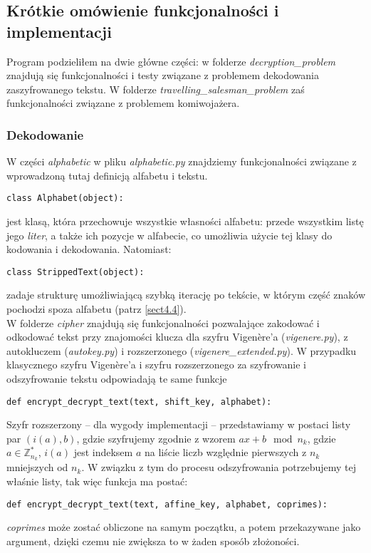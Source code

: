 \documentclass[a4paper]{article}
\theoremstyle{defn}
\theoremstyle{theorem}
\theoremstyle{lemma}
\theoremstyle{cor}
\theoremstyle{fact}
\begin{document}
\subsection{Krótkie omówienie funkcjonalności i implementacji}
Program podzieliłem na dwie główne części: w folderze \textit{decryption\_problem} znajdują się funkcjonalności i testy związane z problemem dekodowania zaszyfrowanego tekstu. W folderze \textit{travelling\_salesman\_problem} zaś funkcjonalności związane z problemem komiwojażera.
\subsubsection{Dekodowanie}
W części \textit{alphabetic} w pliku \textit{alphabetic.py} znajdziemy funkcjonalności związane z wprowadzoną tutaj definicją alfabetu i tekstu.
\begin{lstlisting}
class Alphabet(object):
\end{lstlisting}
jest klasą, która przechowuje wszystkie własności alfabetu: przede wszystkim listę jego \textit{liter}, a także ich pozycje w alfabecie, co umożliwia użycie tej klasy do kodowania i dekodowania. Natomiast:
\begin{lstlisting}
class StrippedText(object):
\end{lstlisting}
zadaje strukturę umożliwiającą szybką iterację po tekście, w którym część znaków pochodzi spoza alfabetu (patrz \ref{sect4.4}).\\
W folderze \textit{cipher} znajdują się funkcjonalności pozwalające zakodować i odkodować tekst przy znajomości klucza dla szyfru Vigenère'a (\textit{vigenere.py}), z autokluczem (\textit{autokey.py}) i rozszerzonego (\textit{vigenere\_extended.py}). W przypadku klasycznego szyfru Vigenère'a i szyfru rozszerzonego za szyfrowanie i odszyfrowanie tekstu odpowiadają te same funkcje
\begin{lstlisting}
def encrypt_decrypt_text(text, shift_key, alphabet):
\end{lstlisting}
Szyfr rozszerzony – dla wygody implementacji – przedstawiamy w postaci listy par $(i(a),b)$, gdzie szyfrujemy zgodnie z wzorem $ax+b \mod n_k$, gdzie $a \in \mathbb{Z}_{n_k}^*$, $i(a)$ jest indeksem $a$ na liście liczb względnie pierwszych z $n_k$ mniejszych od $n_k$. W związku z tym do procesu odszyfrowania potrzebujemy tej właśnie listy, tak więc funkcja ma postać:
\begin{lstlisting}
def encrypt_decrypt_text(text, affine_key, alphabet, coprimes):
\end{lstlisting}
\textit{coprimes} może zostać obliczone na samym początku, a potem przekazywane jako argument, dzięki czemu nie zwiększa to w żaden sposób złożoności.
\end{document}
